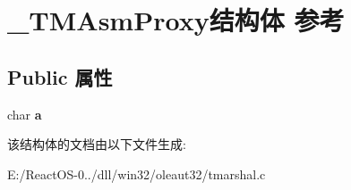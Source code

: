 \hypertarget{struct___t_m_asm_proxy}{}\section{\+\_\+\+T\+M\+Asm\+Proxy结构体 参考}
\label{struct___t_m_asm_proxy}
\subsection*{Public 属性}
\begin{DoxyCompactItemize}
\item 
\mbox{\label{struct___t_m_asm_proxy_a16efe5593d6a27a64ce157fc83137ae9}} 
char {\bfseries a}
\end{DoxyCompactItemize}


该结构体的文档由以下文件生成\+:\begin{DoxyCompactItemize}
\item 
E\+:/\+React\+O\+S-\/0../dll/win32/oleaut32/tmarshal.\+c\end{DoxyCompactItemize}
